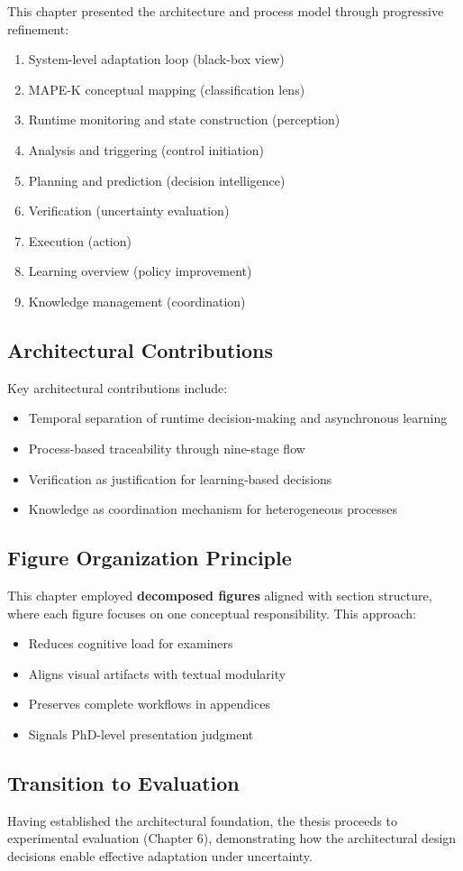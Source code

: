 \documentclass[11pt,a4paper]{article}
\begin{document}
This chapter presented the architecture and process model through progressive refinement:

\begin{enumerate}
    \item System-level adaptation loop (black-box view)
    \item MAPE-K conceptual mapping (classification lens)
    \item Runtime monitoring and state construction (perception)
    \item Analysis and triggering (control initiation)
    \item Planning and prediction (decision intelligence)
    \item Verification (uncertainty evaluation)
    \item Execution (action)
    \item Learning overview (policy improvement)
    \item Knowledge management (coordination)
\end{enumerate}

\subsection{Architectural Contributions}

Key architectural contributions include:

\begin{itemize}
    \item Temporal separation of runtime decision-making and asynchronous learning
    \item Process-based traceability through nine-stage flow
    \item Verification as justification for learning-based decisions
    \item Knowledge as coordination mechanism for heterogeneous processes
\end{itemize}

\subsection{Figure Organization Principle}

This chapter employed \textbf{decomposed figures} aligned with section structure, where each figure focuses on one conceptual responsibility. This approach:

\begin{itemize}
    \item Reduces cognitive load for examiners
    \item Aligns visual artifacts with textual modularity
    \item Preserves complete workflows in appendices
    \item Signals PhD-level presentation judgment
\end{itemize}

\subsection{Transition to Evaluation}

Having established the architectural foundation, the thesis proceeds to experimental evaluation (Chapter 6), demonstrating how the architectural design decisions enable effective adaptation under uncertainty.
\end{document}

